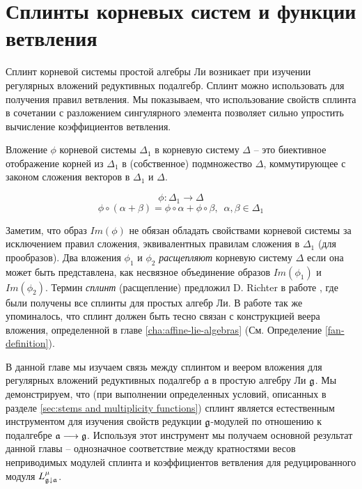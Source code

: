 
\chapter{Сплинты корневых систем и функции ветвления}
\label{cha:splints}


Сплинт корневой системы простой алгебры Ли возникает при изучении регулярных вложений редуктивных подалгебр. Сплинт можно использовать для получения правил ветвления. Мы показываем, что использование свойств сплинта в сочетании с разложением сингулярного элемента позволяет сильно упростить вычисление коэффициентов ветвления. 

Вложение  $\phi$ корневой системы $\Delta_1$ в корневую систему $\Delta$ -- это биективное отображение корней из $\Delta_{1}$ в (собственное) подмножество $\Delta$, коммутирующее с законом сложения векторов в $\Delta_{1}$ и $\Delta$.

\begin{equation*}
\phi:\Delta_1 \longrightarrow \Delta
\end{equation*}
\begin{equation*}
\phi \circ (\alpha + \beta) =\phi \circ \alpha + \phi \circ \beta,
\,\,\, \alpha,\beta \in \Delta_1
\end{equation*}

Заметим, что образ  $Im(\phi)$ не обязан обладать свойствами корневой системы за исключением правил сложения, эквивалентных правилам сложения в  $\Delta_{1}$ (для прообразов). Два вложения  $\phi_1$ и $\phi_2$  {\it расщепляют} корневую систему  $\Delta$ если она может быть представлена, как несвязное объединение образов $Im(\phi_1)$ и $Im(\phi_2)$.   
Термин {\it сплинт} (расщепление) предложил D. Richter в работе  \cite{richter2008splints}, где  были получены все сплинты для простых алгебр Ли. В работе так же упоминалось, что сплинт должен быть тесно связан с конструкцией веера вложения, определенной в главе \ref{cha:affine-lie-algebras} (См. Определение \ref{fan-definition}).

В данной главе мы изучаем связь между сплинтом и веером вложения для регулярных вложений редуктивных подалгебр ${\mathfrak a}$ в простую алгебру Ли $\mathfrak{g}$. Мы демонстрируем, что (при выполнении определенных условий, описанных в разделе \ref{sec:stems and multiplicity functions}) сплинт является естественным инструментом для изучения свойств редукции  $\mathfrak{g}$-модулей по отношению к подалгебре $\mathfrak{a}\longrightarrow\mathfrak{g}$. Используя этот инструмент мы получаем основной результат данной главы -- однозначное соответствие между кратностями весов неприводимых модулей сплинта и коэффициентов ветвления для редуцированного модуля $L^{\mu}_{\mathfrak{g}\downarrow \mathfrak{a}}$.

